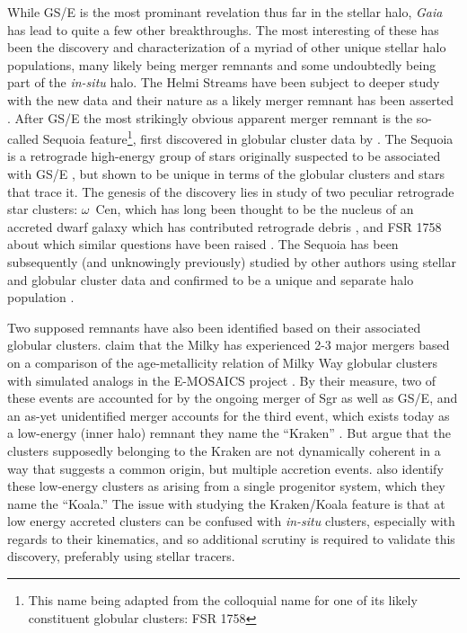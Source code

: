 While GS/E is the most prominant revelation thus far in the stellar halo, \textit{Gaia} has lead to quite a few other breakthroughs. The most interesting of these has been the discovery and characterization of a myriad of other unique stellar halo populations, many likely being merger remnants and some undoubtedly being part of the \textit{in-situ} halo. The Helmi Streams \parencite{helmi99} have been subject to deeper study with the new data and their nature as a likely merger remnant has been asserted \parencite{koppelman19a}. After GS/E the most strikingly obvious apparent merger remnant is the so-called Sequoia feature\footnote{This name being adapted from the colloquial name for one of its likely constituent globular clusters: FSR 1758}, first discovered in globular cluster data by \textcite{myeong19}. The Sequoia is a retrograde high-energy group of stars originally suspected to be associated with GS/E \parencite{helmi18}, but shown to be unique in terms of the globular clusters and stars that trace it. The genesis of the discovery lies in  study of two peculiar retrograde star clusters: $\omega$~Cen, which has long been thought to be the nucleus of an accreted dwarf galaxy which has contributed retrograde debris \parencite{bekki03,majewski12}, and FSR 1758 about which similar questions have been raised \parencite{froebrich07,barba19}. The Sequoia has been subsequently (and unknowingly previously) studied by other authors using stellar and globular cluster data and confirmed to be a unique and separate halo population \parencite{koppelman19b,kruijssen20,monty20,naidu20}.

Two supposed remnants have also been identified based on their associated globular clusters. \textcite{kruijssen19b} claim that the Milky has experienced 2-3 major mergers based on a comparison of the age-metallicity relation of Milky Way globular clusters with simulated analogs in the E-MOSAICS project \parencite{kruijssen19a}. By their measure, two of these events are accounted for by the ongoing merger of Sgr as well as GS/E, and an as-yet unidentified merger accounts for the third event, which exists today as a low-energy (inner halo) remnant they name the ``Kraken'' \parencite{kruijssen20}. But \textcite{massari19} argue that the clusters supposedly belonging to the Kraken are not dynamically coherent in a way that suggests a common origin, but multiple accretion events. \textcite{forbes20} also identify these low-energy clusters as arising from a single progenitor system, which they name the ``Koala.'' The issue with studying the Kraken/Koala feature is that at low energy accreted clusters can be confused with \textit{in-situ} clusters, especially with regards to their kinematics, and so additional scrutiny is required to validate this discovery, preferably using stellar tracers.

